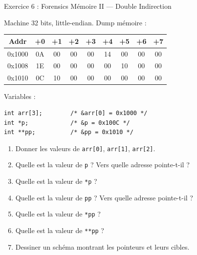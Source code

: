 \documentclass[10pt,a4paper]{article}
\begin{document}
\begin{exercicebox}{Exercice 6 : Forensics Mémoire II — Double Indirection}

Machine 32 bits, little-endian. Dump mémoire :

\begin{center}
\renewcommand{\arraystretch}{1.2}
\begin{tabular}{|c|c|c|c|c|c|c|c|c|}
\hline
\textbf{Addr} & \textbf{+0} & \textbf{+1} & \textbf{+2} & \textbf{+3} & \textbf{+4} & \textbf{+5} & \textbf{+6} & \textbf{+7} \\
\hline
0x1000 & 0A & 00 & 00 & 00 & 14 & 00 & 00 & 00 \\
\hline
0x1008 & 1E & 00 & 00 & 00 & 00 & 10 & 00 & 00 \\
\hline
0x1010 & 0C & 10 & 00 & 00 & 00 & 00 & 00 & 00 \\
\hline
\end{tabular}
\end{center}

Variables :
\begin{lstlisting}[numbers=none]
int arr[3];        /* &arr[0] = 0x1000 */
int *p;            /* &p = 0x100C */
int **pp;          /* &pp = 0x1010 */
\end{lstlisting}

\begin{enumerate}[label=\alph*)]
    \item Donner les valeurs de \texttt{arr[0]}, \texttt{arr[1]}, \texttt{arr[2]}.
    \item Quelle est la valeur de \texttt{p} ? Vers quelle adresse pointe-t-il ?
    \item Quelle est la valeur de \texttt{*p} ?
    \item Quelle est la valeur de \texttt{pp} ? Vers quelle adresse pointe-t-il ?
    \item Quelle est la valeur de \texttt{*pp} ?
    \item Quelle est la valeur de \texttt{**pp} ?
    \item Dessiner un schéma montrant les pointeurs et leurs cibles.
\end{enumerate}

\end{exercicebox}
\end{document}
